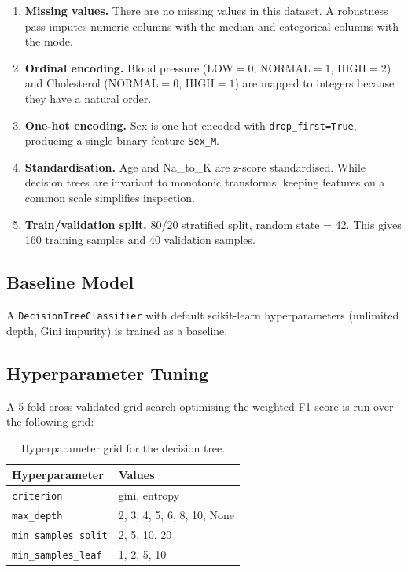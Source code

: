 \documentclass[12pt,a4paper]{article}
\begin{document}
\begin{enumerate}
  \item \textbf{Missing values.}  There are no missing values in this dataset.
        A robustness pass imputes numeric columns with the median and
        categorical columns with the mode.
  \item \textbf{Ordinal encoding.}  Blood pressure (LOW$=0$, NORMAL$=1$,
        HIGH$=2$) and Cholesterol (NORMAL$=0$, HIGH$=1$) are mapped to
        integers because they have a natural order.
  \item \textbf{One-hot encoding.}  Sex is one-hot encoded with
        \texttt{drop\_first=True}, producing a single binary feature
        \texttt{Sex\_M}.
  \item \textbf{Standardisation.}  Age and Na\_to\_K are z-score standardised.
        While decision trees are invariant to monotonic transforms, keeping
        features on a common scale simplifies inspection.
  \item \textbf{Train/validation split.}  80/20 stratified split, random
        state = 42.  This gives 160 training samples and 40 validation samples.
\end{enumerate}

\subsection{Baseline Model}

A \texttt{DecisionTreeClassifier} with default scikit-learn hyperparameters
(unlimited depth, Gini impurity) is trained as a baseline.

\subsection{Hyperparameter Tuning}

A 5-fold cross-validated grid search optimising the weighted F1 score is run
over the following grid:

\begin{table}[H]
  \centering
  \caption{Hyperparameter grid for the decision tree.}
  \begin{tabular}{ll}
    \toprule
    Hyperparameter & Values \\
    \midrule
    \texttt{criterion}         & gini, entropy \\
    \texttt{max\_depth}        & 2, 3, 4, 5, 6, 8, 10, None \\
    \texttt{min\_samples\_split} & 2, 5, 10, 20 \\
    \texttt{min\_samples\_leaf}  & 1, 2, 5, 10 \\
    \bottomrule
  \end{tabular}
\end{table}
\end{document}
